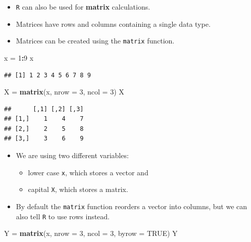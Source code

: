\documentclass[]{book}
\newenvironment{Shaded}{\begin{snugshade}}{\end{snugshade}}
\newcommand{\KeywordTok}[1]{\textcolor[rgb]{0.13,0.29,0.53}{\textbf{#1}}}
\newcommand{\DataTypeTok}[1]{\textcolor[rgb]{0.13,0.29,0.53}{#1}}
\newcommand{\DecValTok}[1]{\textcolor[rgb]{0.00,0.00,0.81}{#1}}
\newcommand{\StringTok}[1]{\textcolor[rgb]{0.31,0.60,0.02}{#1}}
\newcommand{\OtherTok}[1]{\textcolor[rgb]{0.56,0.35,0.01}{#1}}
\newcommand{\OperatorTok}[1]{\textcolor[rgb]{0.81,0.36,0.00}{\textbf{#1}}}
\newcommand{\NormalTok}[1]{#1}
\providecommand{\tightlist}{%
  \setlength{\itemsep}{0pt}\setlength{\parskip}{0pt}}
\begin{document}
\begin{itemize}
\item
  \texttt{R} can also be used for \textbf{matrix} calculations.
\item
  Matrices have rows and columns containing a single data type.
\item
  Matrices can be created using the \texttt{matrix} function.
\end{itemize}

\begin{Shaded}
\begin{Highlighting}[]
\NormalTok{x =}\StringTok{ }\DecValTok{1}\OperatorTok{:}\DecValTok{9}
\NormalTok{x}
\end{Highlighting}
\end{Shaded}

\begin{verbatim}
## [1] 1 2 3 4 5 6 7 8 9
\end{verbatim}

\begin{Shaded}
\begin{Highlighting}[]
\NormalTok{X =}\StringTok{ }\KeywordTok{matrix}\NormalTok{(x, }\DataTypeTok{nrow =} \DecValTok{3}\NormalTok{, }\DataTypeTok{ncol =} \DecValTok{3}\NormalTok{)}
\NormalTok{X}
\end{Highlighting}
\end{Shaded}

\begin{verbatim}
##      [,1] [,2] [,3]
## [1,]    1    4    7
## [2,]    2    5    8
## [3,]    3    6    9
\end{verbatim}

\begin{itemize}
\tightlist
\item
  We are using two different variables:

  \begin{itemize}
  \tightlist
  \item
    lower case \texttt{x}, which stores a vector and
  \item
    capital \texttt{X}, which stores a matrix.
  \end{itemize}
\item
  By default the \texttt{matrix} function reorders a vector into
  columns, but we can also tell \texttt{R} to use rows instead.
\end{itemize}

\begin{Shaded}
\begin{Highlighting}[]
\NormalTok{Y =}\StringTok{ }\KeywordTok{matrix}\NormalTok{(x, }\DataTypeTok{nrow =} \DecValTok{3}\NormalTok{, }\DataTypeTok{ncol =} \DecValTok{3}\NormalTok{, }\DataTypeTok{byrow =} \OtherTok{TRUE}\NormalTok{)}
\NormalTok{Y}
\end{Highlighting}
\end{Shaded}
\end{document}
